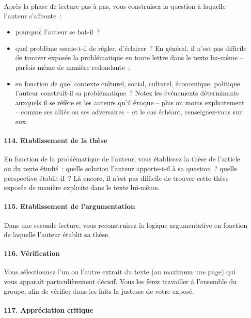 Après la phase de lecture pas à pas, vous construisez la question à
laquelle l'auteur s'affronte~:

\begin{itemize}
\item
  pourquoi l'auteur se bat-il~?
\item
  quel problème essaie-t-il de régler, d'éclairer~? En général, il n'est
  pas difficile de trouver exposée la problématique en toute lettre dans
  le texte lui-même -- parfois même de manière redondante~;
\item
  en fonction de quel contexte culturel, social, culturel, économique,
  politique l'auteur construit-il sa problématique~? Notez les
  événements déterminants auxquels il se réfère et les auteurs qu'il
  évoque -- plus ou moins explicitement -- comme ses alliés ou ses
  adversaires -- et le cas échéant, renseignez-vous sur eux.
\end{itemize}

\paragraph{114. Etablissement de la thèse}

En fonction de la problématique de l'auteur, vous établissez la thèse de
l'article ou du texte étudié~: quelle solution l'auteur apporte-t-il à
sa question~? quelle perspective établit-il~? Là encore, il n'est pas
difficile de trouver cette thèse exposée de manière explicite dans le
texte lui-même.

\paragraph{115. Etablissement de l'argumentation}

Dans une seconde lecture, vous reconstruisez la logique argumentative en
fonction de laquelle l'auteur établit sa thèse.

\paragraph{116. Vérification}

Vous sélectionnez l'un ou l'autre extrait du texte (au maximum une page)
qui vous apparaît particulièrement décisif. Vous les ferez travailler à
l'ensemble du groupe, afin de vérifier dans les faits la justesse de
votre exposé.

\paragraph{117. Appréciation critique}

